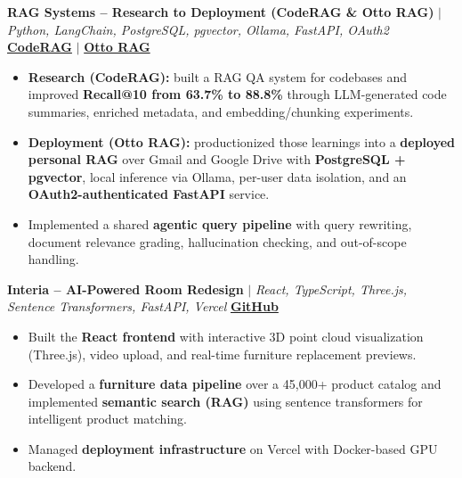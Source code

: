 \documentclass[11pt,letterpaper]{article}
\begin{document}
\textbf{RAG Systems -- Research to Deployment (CodeRAG \& Otto RAG)} $|$
\textit{Python, LangChain, PostgreSQL, pgvector, Ollama, FastAPI, OAuth2} \hfill \href{https://github.com/AStroCvijo/coderag}{\textbf{CodeRAG}} $|$ \href{https://github.com/AStroCvijo/otto_rag}{\textbf{Otto RAG}}
\begin{itemize}[noitemsep,topsep=2pt,leftmargin=*]
    \item \textbf{Research (CodeRAG):} built a RAG QA system for codebases and improved \textbf{Recall@10 from 63.7\% to 88.8\%} through LLM-generated code summaries, enriched metadata, and embedding/chunking experiments.
    \item \textbf{Deployment (Otto RAG):} productionized those learnings into a \textbf{deployed personal RAG} over Gmail and Google Drive with \textbf{PostgreSQL + pgvector}, local inference via Ollama, per-user data isolation, and an \textbf{OAuth2-authenticated FastAPI} service.
    \item Implemented a shared \textbf{agentic query pipeline} with query rewriting, document relevance grading, hallucination checking, and out-of-scope handling.
\end{itemize}

\vspace{0.1cm}

\textbf{Interia -- AI-Powered Room Redesign} $|$
\textit{React, TypeScript, Three.js, Sentence Transformers, FastAPI, Vercel} \hfill \href{https://github.com/deepgrad/epiplar.io}{\textbf{GitHub}}
\begin{itemize}[noitemsep,topsep=2pt,leftmargin=*]
    \item Built the \textbf{React frontend} with interactive 3D point cloud visualization (Three.js), video upload, and real-time furniture replacement previews.
    \item Developed a \textbf{furniture data pipeline} over a 45,000+ product catalog and implemented \textbf{semantic search (RAG)} using sentence transformers for intelligent product matching.
    \item Managed \textbf{deployment infrastructure} on Vercel with Docker-based GPU backend.
\end{itemize}

\vspace{0.1cm}
\end{document}

